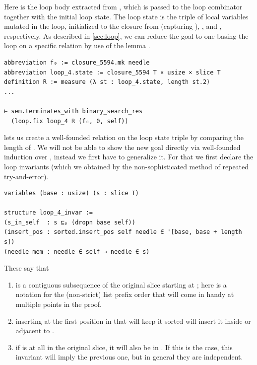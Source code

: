 Here  is the loop body extracted from ,
which is passed to the loop combinator  together with the initial
loop state. The loop state is the triple  of local variables
mutated in the loop, initialized to the closure from 
(capturing ), , and , respectively. As described
in \autoref{sec:loop}, we can reduce the goal to one basing the loop on a
specific relation by use of the lemma .

\begin{verbatim}
abbreviation f₀ := closure_5594.mk needle
abbreviation loop_4.state := closure_5594 T × usize × slice T
definition R := measure (λ st : loop_4.state, length st.2)
...

⊢ sem.terminates_with binary_search_res
  (loop.fix loop_4 R (f₀, 0, self))
\end{verbatim}

 lets us create a well-founded relation on the loop state triple
by comparing the length of . We will not be able to show the new goal
directly via well-founded induction over , instead we first have to
generalize it. For that we first declare the loop invariants (which we obtained by
the non-sophisticated method of repeated try-and-error).

\begin{verbatim}
variables (base : usize) (s : slice T)

structure loop_4_invar :=
(s_in_self  : s ⊑ₚ (dropn base self))
(insert_pos : sorted.insert_pos self needle ∈ '[base, base + length s])
(needle_mem : needle ∈ self → needle ∈ s)
\end{verbatim}

These say that
\begin{enumerate}
\item {} is a contiguous subsequence of the original slice  starting at ; here  is a
  notation for the (non-strict) list prefix order that will come in handy at multiple points
  in the proof.
\item inserting  at the first position in  that will
  keep it sorted will insert it inside or adjacent to .
\item if  is at all in the original slice, it will also be in
  . If this is the case, this invariant will imply the previous one, but in
  general they are independent.
\end{enumerate}

